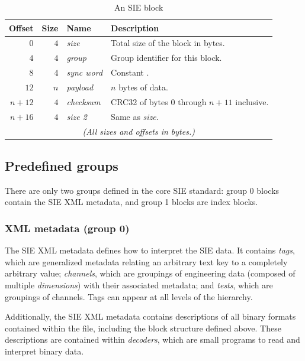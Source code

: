 \documentclass{article}
\begin{document}
\def\blocktable{
  \begin{center}
    \begin{tabular}{rrll}
      \textbf{Offset} & \textbf{Size} & 
        \textbf{Name} & \textbf{Description} \\ \hline
    $0$      & $4$ & \emph{size}      & Total size of the block in bytes. \\ 
    $4$      & $4$ & \emph{group}     & Group identifier for this block.  \\ 
    $8$      & $4$ & \emph{sync word} & Constant \lit{51EDA7A0}.          \\ 
    $12$     & $n$ & \emph{payload}   & $n$ bytes of data.                \\ 
    $n + 12$ & $4$ & \emph{checksum}  &
        CRC32 of bytes $0$ through $n + 11$ inclusive.                    \\ 
    $n + 16$ & $4$ & \emph{size 2}    & Same as \emph{size}.              \\ 
    \multicolumn{4}{c}{\emph{(All sizes and offsets in bytes.)}}
    \end{tabular}
  \end{center}
}

\begin{table}
  \blocktable
  \caption{An SIE block}  \label{block-tab}
\end{table}

\subsection{Predefined groups}

There are only two groups defined in the core SIE standard:  group 0
blocks contain the SIE XML metadata, and group 1 blocks are index
blocks.

\subsubsection{XML metadata (group 0)}

The SIE XML metadata defines how to interpret the SIE data.  It
contains \emph{tags}, which are generalized metadata relating an
arbitrary text key to a completely arbitrary value; \emph{channels},
which are groupings of engineering data (composed of multiple
\emph{dimensions}) with their associated metadata; and \emph{tests},
which are groupings of channels.  Tags can appear at all levels of the
hierarchy.

Additionally, the SIE XML metadata contains descriptions of all binary
formats contained within the file, including the block structure
defined above.  These descriptions are contained within
\emph{decoders}, which are small programs to read and interpret binary
data.
\end{document}
